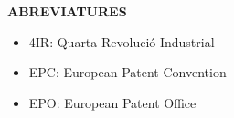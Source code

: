 \documentclass[12pt]{article}
\renewcommand{\_}{\kern-1.5pt\textunderscore\kern-1.5pt}
\begin{document}
\vspace{\baselineskip}

\vspace{\baselineskip}

\vspace{\baselineskip}

\vspace{\baselineskip}

\vspace{\baselineskip}

\vspace{\baselineskip}

\vspace{\baselineskip}

\vspace{\baselineskip}

\vspace{\baselineskip}
\begin{Center}
{\fontsize{16pt}{19.2pt}\selectfont \textbf{ABREVIATURES}\par}
\end{Center}\par


\vspace{\baselineskip}

\vspace{\baselineskip}

\vspace{\baselineskip}
\begin{itemize}
	\item 4IR: Quarta Revolució Industrial\par


\vspace{\baselineskip}
	\item EPC: European Patent Convention\par


\vspace{\baselineskip}
	\item EPO: European Patent Office
\end{itemize}\par
\end{document}
